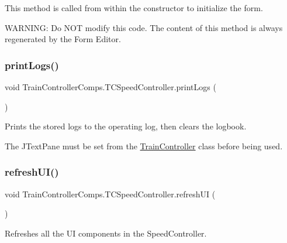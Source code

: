 This method is called from within the constructor to initialize the form. 

W\+A\+R\+N\+I\+NG\+: Do N\+OT modify this code. The content of this method is always regenerated by the Form Editor. \mbox{\label{classTrainControllerComps_1_1TCSpeedController_a0aff8debe964e2c66d38a065052bbb2a}} 
\subsubsection{\texorpdfstring{print\+Logs()}{printLogs()}}
{\footnotesize\ttfamily void Train\+Controller\+Comps.\+T\+C\+Speed\+Controller.\+print\+Logs (\begin{DoxyParamCaption}{ }\end{DoxyParamCaption})}



Prints the stored logs to the operating log, then clears the logbook. 

The J\+Text\+Pane must be set from the \hyperlink{classTrainControllerComps_1_1TrainController}{Train\+Controller} class before being used. \mbox{\label{classTrainControllerComps_1_1TCSpeedController_a037818d87276a705484f59c19cdbfa6f}} 
\subsubsection{\texorpdfstring{refresh\+U\+I()}{refreshUI()}}
{\footnotesize\ttfamily void Train\+Controller\+Comps.\+T\+C\+Speed\+Controller.\+refresh\+UI (\begin{DoxyParamCaption}{ }\end{DoxyParamCaption})}



Refreshes all the UI components in the Speed\+Controller. 

